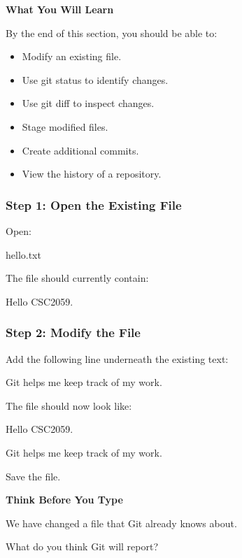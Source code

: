 \documentclass{csc2059practical}
\begin{document}
\begin{learningoutcomes}
\textbf{What You Will Learn}\par
\medskip
By the end of this section, you should be able to:

\begin{itemize}
  \item Modify an existing file.
  \item Use git status to identify changes.
  \item Use git diff to inspect changes.
  \item Stage modified files.
  \item Create additional commits.
  \item View the history of a repository.
\end{itemize}
\end{learningoutcomes}
\subsubsection{Step 1: Open the Existing File}
Open:

\begin{terminalplain}
hello.txt
\end{terminalplain}
The file should currently contain:

\begin{terminalplain}
Hello CSC2059.
\end{terminalplain}
\subsubsection{Step 2: Modify the File}
Add the following line underneath the existing text:

Git helps me keep track of my work.

The file should now look like:

\begin{terminalplain}
Hello CSC2059.
\end{terminalplain}
Git helps me keep track of my work.

Save the file.

\begin{commonerror}
\textbf{Think Before You Type}\par
\medskip

We have changed a file that Git already knows about.


What do you think Git will report?


\end{commonerror}
\end{document}
